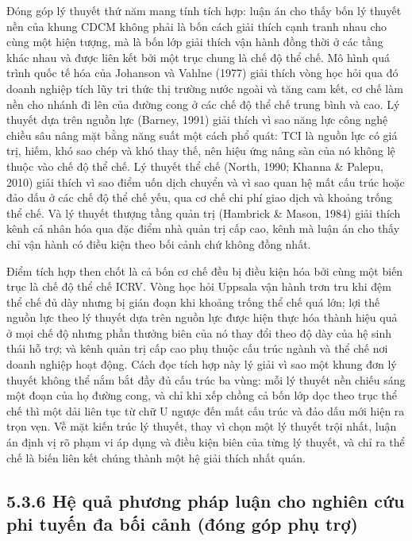 \documentclass[
  a4paper,
  13pt]{extreport}
\begin{document}
Đóng góp lý thuyết thứ năm mang tính tích hợp: luận án cho thấy bốn lý
thuyết nền của khung CDCM không phải là bốn cách giải thích cạnh tranh
nhau cho cùng một hiện tượng, mà là bốn lớp giải thích vận hành đồng
thời ở các tầng khác nhau và được liên kết bởi một trục chung là chế độ
thể chế. Mô hình quá trình quốc tế hóa của Johanson và Vahlne (1977)
giải thích vòng học hỏi qua đó doanh nghiệp tích lũy tri thức thị trường
nước ngoài và tăng cam kết, cơ chế làm nền cho nhánh đi lên của đường
cong ở các chế độ thể chế trung bình và cao. Lý thuyết dựa trên nguồn
lực (Barney, 1991) giải thích vì sao năng lực công nghệ chiều sâu nâng
mặt bằng năng suất một cách phổ quát: TCI là nguồn lực có giá trị, hiếm,
khó sao chép và khó thay thế, nên hiệu ứng nâng sàn của nó không lệ
thuộc vào chế độ thể chế. Lý thuyết thể chế (North, 1990; Khanna \&
Palepu, 2010) giải thích vì sao điểm uốn dịch chuyển và vì sao quan hệ
mất cấu trúc hoặc đảo dấu ở các chế độ thể chế yếu, qua cơ chế chi phí
giao dịch và khoảng trống thể chế. Và lý thuyết thượng tầng quản trị
(Hambrick \& Mason, 1984) giải thích kênh cá nhân hóa qua đặc điểm nhà
quản trị cấp cao, kênh mà luận án cho thấy chỉ vận hành có điều kiện
theo bối cảnh chứ không đồng nhất.

Điểm tích hợp then chốt là cả bốn cơ chế đều bị điều kiện hóa bởi cùng
một biến trục là chế độ thể chế ICRV. Vòng học hỏi Uppsala vận hành trơn
tru khi đệm thể chế đủ dày nhưng bị gián đoạn khi khoảng trống thể chế
quá lớn; lợi thế nguồn lực theo lý thuyết dựa trên nguồn lực được hiện
thực hóa thành hiệu quả ở mọi chế độ nhưng phần thưởng biên của nó thay
đổi theo độ dày của hệ sinh thái hỗ trợ; và kênh quản trị cấp cao phụ
thuộc cấu trúc ngành và thể chế nơi doanh nghiệp hoạt động. Cách đọc
tích hợp này lý giải vì sao một khung đơn lý thuyết không thể nắm bắt
đầy đủ cấu trúc ba vùng: mỗi lý thuyết nền chiếu sáng một đoạn của họ
đường cong, và chỉ khi xếp chồng cả bốn lớp dọc theo trục thể chế thì
một dải liên tục từ chữ U ngược đến mất cấu trúc và đảo dấu mới hiện ra
trọn vẹn. Về mặt kiến trúc lý thuyết, thay vì chọn một lý thuyết trội
nhất, luận án định vị rõ phạm vi áp dụng và điều kiện biên của từng lý
thuyết, và chỉ ra thể chế là biến liên kết chúng thành một hệ giải thích
nhất quán.

\hypertarget{hux1ec7-quux1ea3-phux1b0ux1a1ng-phuxe1p-luux1eadn-cho-nghiuxean-cux1ee9u-phi-tuyux1ebfn-ux111a-bux1ed1i-cux1ea3nh-ux111uxf3ng-guxf3p-phux1ee5-trux1ee3}{%
\subsection{5.3.6 Hệ quả phương pháp luận cho nghiên cứu phi tuyến đa
bối cảnh (đóng góp phụ
trợ)}\label{hux1ec7-quux1ea3-phux1b0ux1a1ng-phuxe1p-luux1eadn-cho-nghiuxean-cux1ee9u-phi-tuyux1ebfn-ux111a-bux1ed1i-cux1ea3nh-ux111uxf3ng-guxf3p-phux1ee5-trux1ee3}}
\end{document}
